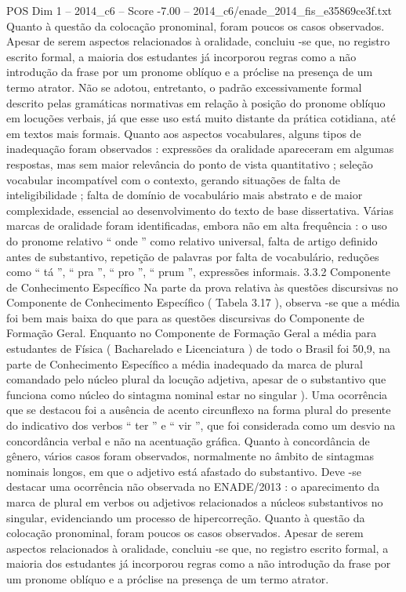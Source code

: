 \begin{textsample}{POS Dim 1 – 2014\_c6 – Score -7.00 – 2014\_c6/enade\_2014\_fis\_e35869ce3f.txt}
Quanto à questão da colocação pronominal, foram poucos os casos observados.
Apesar de serem aspectos relacionados à oralidade, concluiu -se que, no registro escrito formal, a maioria dos estudantes já incorporou regras como a não introdução da frase por um pronome oblíquo e a próclise na presença de um termo atrator.
Não se adotou, entretanto, o padrão excessivamente formal descrito pelas gramáticas normativas em relação à posição do pronome oblíquo em locuções verbais, já que esse uso está muito distante da prática cotidiana, até em textos mais formais.
Quanto aos aspectos vocabulares, alguns tipos de inadequação foram observados : expressões da oralidade apareceram em algumas respostas, mas sem maior relevância do ponto de vista quantitativo ; seleção vocabular incompatível com o contexto, gerando situações de falta de inteligibilidade ; falta de domínio de vocabulário mais abstrato e de maior complexidade, essencial ao desenvolvimento do texto de base dissertativa.
Várias marcas de oralidade foram identificadas, embora não em alta frequência : o uso do pronome relativo “ onde ” como relativo universal, falta de artigo definido antes de substantivo, repetição de palavras por falta de vocabulário, reduções como “ tá ”, “ pra ”, “ pro ”, “ prum ”, expressões informais. 3.3.2 Componente de Conhecimento Específico Na parte da prova relativa às questões discursivas no Componente de Conhecimento Específico ( Tabela 3.17 ), observa -se que a média foi bem mais baixa do que para as questões discursivas do Componente de Formação Geral.
Enquanto no Componente de Formação Geral a média para estudantes de Física ( Bacharelado e Licenciatura ) de todo o Brasil foi 50,9, na parte de Conhecimento Específico a média inadequado da marca de plural comandado pelo núcleo plural da locução adjetiva, apesar de o substantivo que funciona como núcleo do sintagma nominal estar no singular ).
Uma ocorrência que se destacou foi a ausência de acento circunflexo na forma plural do presente do indicativo dos verbos “ ter ” e “ vir ”, que foi considerada como um desvio na concordância verbal e não na acentuação gráfica.
Quanto à concordância de gênero, vários casos foram observados, normalmente no âmbito de sintagmas nominais longos, em que o adjetivo está afastado do substantivo.
Deve -se destacar uma ocorrência não observada no ENADE/2013 : o aparecimento da marca de plural em verbos ou adjetivos relacionados a núcleos substantivos no singular, evidenciando um processo de hipercorreção.
Quanto à questão da colocação pronominal, foram poucos os casos observados.
Apesar de serem aspectos relacionados à oralidade, concluiu -se que, no registro escrito formal, a maioria dos estudantes já incorporou regras como a não introdução da frase por um pronome oblíquo e a próclise na presença de um termo atrator.

\end{textsample}
